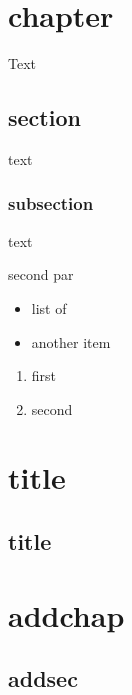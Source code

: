 \documentclass{book}
\begin{document}
\tableofcontents

\chapter{chapter}

Text

\section{section}

text

\subsection{subsection}

text

second par

\begin{itemize}
\item list of 
\item another item
\end{itemize}


\begin{enumerate}
\item first
\item second
\end{enumerate}

\chapter*{title}

\section*{title}


\chapter*{addchap}

\section*{addsec}
\end{document}
